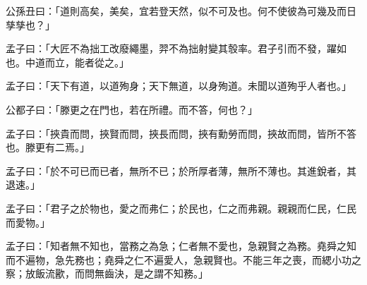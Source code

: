 \documentclass[12pt,a4paper]{ctexbook}
\begin{document}
公孫丑曰：「道則高矣，美矣，宜若登天然，似不可及也。何不使彼為可幾及而日孳孳也？」\par
孟子曰：「大匠不為拙工改廢繩墨，羿不為拙射變其彀率。君子引而不發，躍如也。中道而立，能者從之。」\par
孟子曰：「天下有道，以道殉身；天下無道，以身殉道。未聞以道殉乎人者也。」\par
公都子曰：「滕更之在門也，若在所禮。而不答，何也？」\par
孟子曰：「挾貴而問，挾賢而問，挾長而問，挾有勳勞而問，挾故而問，皆所不答也。滕更有二焉。」\par
孟子曰：「於不可已而已者，無所不已；於所厚者薄，無所不薄也。其進銳者，其退速。」\par
孟子曰：「君子之於物也，愛之而弗仁；於民也，仁之而弗親。親親而仁民，仁民而愛物。」\par
孟子曰：「知者無不知也，當務之為急；仁者無不愛也，急親賢之為務。堯舜之知而不遍物，急先務也；堯舜之仁不遍愛人，急親賢也。不能三年之喪，而緦小功之察；放飯流歠，而問無齒決，是之謂不知務。」\par
\end{document}
